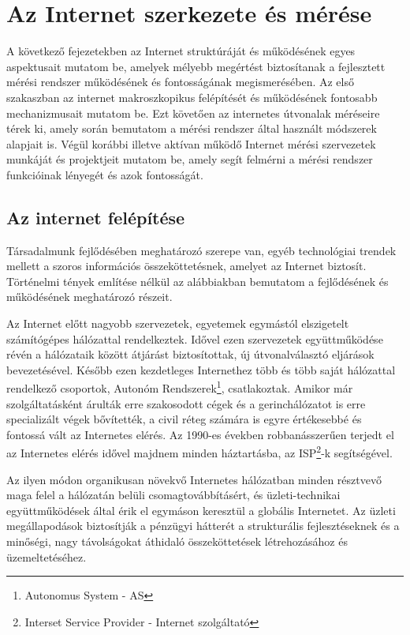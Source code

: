 \chapter{Az Internet szerkezete és mérése}

A következő fejezetekben az Internet struktúráját és működésének egyes aspektusait mutatom be, amelyek mélyebb megértést biztosítanak a fejlesztett mérési rendszer működésének és fontosságának megismerésében.
Az első szakaszban az internet makroszkopikus felépítését és működésének fontosabb mechanizmusait mutatom be. Ezt követően az internetes útvonalak méréseire térek ki, amely során bemutatom a mérési rendszer által használt módszerek alapjait is. Végül korábbi illetve aktívan működő Internet mérési szervezetek munkáját és projektjeit mutatom be, amely segít felmérni a mérési rendszer funkcióinak lényegét és azok fontosságát.



\section{Az internet felépítése}



Társadalmunk fejlődésében meghatározó szerepe van, egyéb technológiai trendek mellett a szoros információs összeköttetésnek, amelyet az Internet biztosít. Történelmi tények említése nélkül az alábbiakban bemutatom a fejlődésének és működésének meghatározó részeit.

Az Internet előtt nagyobb szervezetek, egyetemek egymástól elszigetelt számítógépes há\-ló\-zat\-tal rendelkeztek. Idővel ezen szervezetek együttműködése révén a hálózataik között átjárást biztosítottak, új útvonalválasztó eljárások bevezetésével. Később ezen kezdetleges Internethez több és több saját hálózattal rendelkező csoportok, Autonóm Rendszerek\footnote{Autonomus System - AS}, csatlakoztak. Amikor már szolgáltatásként árulták erre szakosodott cégek és a gerinchálózatot is erre specializált végek bővítették,  a civil réteg számára is egyre értékesebbé és fontossá vált az Internetes elérés. Az 1990-es években robbanásszerűen terjedt el az Internetes elérés idővel majdnem minden háztartásba, az ISP\footnote{Interset Service Provider - Internet szolgáltató}-k segítségével.

Az ilyen módon organikusan növekvő Internetes hálózatban  minden résztvevő maga felel a hálózatán belüli csomagtovábbításért, és üzleti-technikai együttműködések által érik el egymáson keresztül a globális Internetet. Az üzleti megállapodások biztosítják a pénzügyi hátterét a strukturális fejlesztéseknek és a minőségi, nagy távolságokat áthidaló összeköttetések létrehozásához és üzemeltetéséhez.


